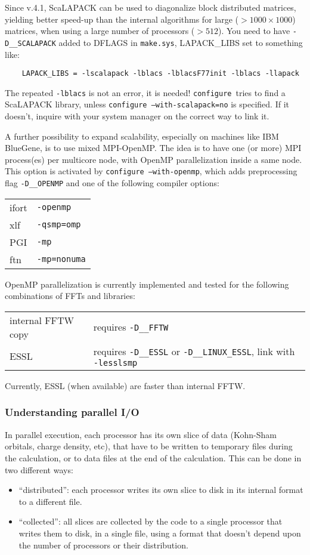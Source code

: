 \documentclass[12pt,a4paper]{article}
\def\configure{\texttt{configure}}
\begin{document}
Since v.4.1, ScaLAPACK can be used to diagonalize block distributed
matrices, yielding better speed-up than the internal algorithms for
large ($ > 1000\times 1000$) matrices, when using a large number of processors 
($> 512$). You need to have \texttt{-D\_\_SCALAPACK} added to DFLAGS 
in \texttt{make.sys}, LAPACK\_LIBS set to something like:
\begin{verbatim}
    LAPACK_LIBS = -lscalapack -lblacs -lblacsF77init -lblacs -llapack
\end{verbatim}
The repeated \texttt{-lblacs} is not an error, it is needed! 
\configure\ tries to find a ScaLAPACK  library, unless 
\texttt{configure --with-scalapack=no} is specified.
If it doesn't, inquire with your system manager
on the correct way to link it.

A further possibility to expand scalability, especially on machines
like IBM BlueGene, is to use mixed MPI-OpenMP. The idea is to have
one (or more) MPI process(es) per multicore node, with OpenMP
parallelization inside a same node. This option is activated by  \texttt{configure --with-openmp},
which adds preprocessing flag \texttt{-D\_\_OPENMP}
and one  of the following compiler options:

\begin{tabular}{ll}
 ifort& \texttt{-openmp}\\
 xlf&   \texttt{-qsmp=omp}\\
 PGI&   \texttt{-mp}\\
 ftn&   \texttt{-mp=nonuma}\\
\end{tabular}

OpenMP parallelization is currently implemented and tested for the following combinations of FFTs
and libraries:

\begin{tabular}{ll}
 internal FFTW copy &requires \texttt{-D\_\_FFTW}\\
 ESSL& requires \texttt{-D\_\_ESSL} or \texttt{-D\_\_LINUX\_ESSL}, link 
 with \texttt{-lesslsmp}\\
\end{tabular}

Currently, ESSL (when available) are faster than internal FFTW.

\subsubsection{Understanding parallel I/O}
In parallel execution, each processor has its own slice of data
(Kohn-Sham orbitals, charge density, etc), that have to be written
to temporary files during the calculation,
or to data files at the end of the calculation.
This can be done in two different ways:
\begin{itemize}
\item ``distributed'': each processor
writes its own slice to disk in its internal 
format to a different file. 
\item ``collected'': all slices are
collected by the code to a single processor
that writes them to disk, in a single file,
using a format that doesn't depend upon 
the number of processors or their distribution.
\end{itemize}
\end{document}
